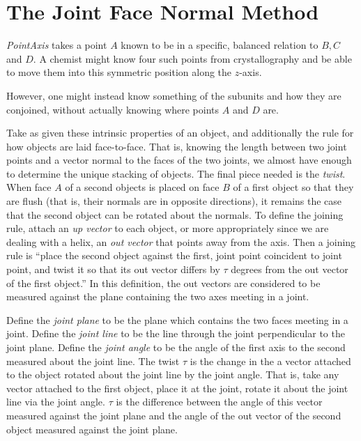 \documentclass{svproc}
\begin{document}
\section{The Joint Face Normal Method}
\label{sec:facenormal}

{\em PointAxis} takes a point $A$ known to be in a specific, balanced relation
to $B, C$ and $D$. A chemist might know four such points from crystallography
and be able to move them into this symmetric position along the $z$-axis.

However, one might instead know something of the subunits and
how they are conjoined, without actually knowing where points $A$
and $D$ are.

Take as given these intrinsic properties of an object, and additionally the
rule for how objects are laid face-to-face. That is, knowing the length between two
joint points and a vector normal to the faces of the two joints, we almost have
enough to determine the unique stacking of objects. The final piece
needed is
the {\em twist}. When face $A$ of a second objects is placed on face $B$
of a first object so that they are flush (that is, their normals are in opposite directions),
it remains the case that the second object can be rotated about the normals. To
define the joining rule, attach an {\em up vector} to each object, or more appropriately
since we are dealing with a helix, an {\em out vector} that points away from the axis.
Then a joining
rule is ``place the second object against the first, joint point coincident to joint point,
and twist it so that its out vector differs by $\tau$ degrees from the out vector of the first
object.'' In this definition, the out vectors are considered to be measured against the plane
containing the two axes meeting in a joint.

Define the {\em joint plane} to be the plane which contains the two faces meeting in a joint.
Define the {\em joint line} to be the line through the joint perpendicular to the joint plane.
Define the {\em joint angle} to be the angle of the first axis to the second measured about
the joint line.
The twist $\tau$ is the change in the a vector attached to the object rotated about the joint
line by the joint angle. That is, take any vector attached to the first object, place it at
the joint, rotate it about the joint line via the joint angle. $\tau$ is the difference
between the angle of this vector measured against the joint plane and the angle of the
out vector of the second object measured against the joint plane.
\end{document}
